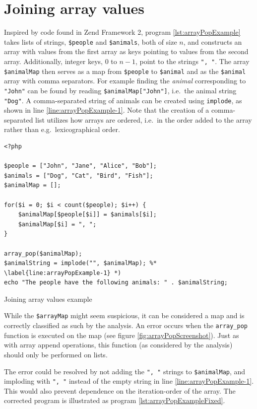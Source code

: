 \newpage
\section{Joining array values}
\label{sec:joiningarrayvalues}
Inspired by code found in Zend Framework 2, program \ref{lst:arrayPopExample} takes lists of strings, \texttt{\$people} and \texttt{\$animals},  both of size $n$, and constructs an array with values from the first array as keys pointing to values from the second array. Additionally, integer keys, $0$ to $n-1$, point to the strings \texttt{", "}. The array \texttt{\$animalMap} then serves as a map from \texttt{\$people} to \texttt{\$animal} and as the \texttt{\$animal} array with comma separators. For example finding the \textit{animal} corresponding to \texttt{"John"} can be found by reading \texttt{\$animalMap["John"]}, i.e.\ the animal string \texttt{"Dog"}. A comma-separated string of animals can be created using \texttt{implode}, as shown in line \ref{line:arrayPopExample-1}. Note that the creation of a comma-separated list utilizes how arrays are ordered, i.e.\ in the order added to the array rather than e.g.\ lexicographical 
order. 

\begin{program}
\begin{lstlisting}
<?php

$people = ["John", "Jane", "Alice", "Bob"];
$animals = ["Dog", "Cat", "Bird", "Fish"];
$animalMap = [];

for($i = 0; $i < count($people); $i++) {
    $animalMap[$people[$i]] = $animals[$i];
    $animalMap[$i] = ", ";
}

array_pop($animalMap);
$animalString = implode("", $animalMap); %* \label{line:arrayPopExample-1} *)
echo "The people have the following animals: " . $animalString;
\end{lstlisting}
\caption{Joining array values example}
\label{lst:arrayPopExample}
\end{program}


While the \texttt{\$arrayMap} might seem suspicious, it can be considered a map and is correctly classified as such by the analysis. An error occurs when the \texttt{array\_pop} function is executed on the map (see figure \ref{fig:arrayPopScreenshot}). Just as with array append operations, this function (as considered by the analysis) should only be performed on lists. 

The error could be resolved by not adding the \texttt{", "} strings to \texttt{\$animalMap}, and imploding with \texttt{", "} instead of the empty string in line \ref{line:arrayPopExample-1}. This would also prevent dependence on the iteration-order of the array. The corrected program is illustrated as program \ref{lst:arrayPopExampleFixed}.

